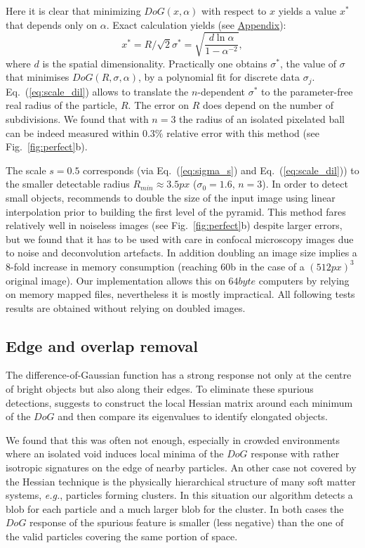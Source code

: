 \documentclass[8.5pt,twoside,twocolumn]{article}
\begin{document}
Here it is clear that minimizing $DoG(x, \alpha)$ with respect to $x$ yields a value $x^*$ that depends only on $\alpha$. Exact calculation yields (see \hyperref[sec:gaussian_vs_ball]{Appendix}):
\begin{equation}
	x^* = R/\sqrt{2}\sigma^* = \sqrt{\frac{d\ln \alpha}{1-\alpha^{-2}}}, 
	\label{eq:scale_dil}
\end{equation}
where $d$ is the spatial dimensionality. 
Practically one obtains $\sigma^*$, the value of $\sigma$ that minimises $DoG(R,\sigma, \alpha)$, by a polynomial fit for discrete data $\sigma_j$. Eq.~(\ref{eq:scale_dil}) allows to translate the $n$-dependent $\sigma^*$ to the parameter-free real radius of the particle, $R$. The error on $R$ does depend on the number of subdivisions. We found that with $n=3$ the radius of an isolated pixelated ball can be indeed measured within $0.3\%$ relative error with this method (see Fig.~\ref{fig:perfect}b).

The scale $s=0.5$ corresponds (via Eq.~(\ref{eq:sigma_s}) and Eq.~(\ref{eq:scale_dil})) to the smaller detectable radius $R_{min}\approx \unit{3.5}{px}$ ($\sigma_0=1.6$, $n=3$). In order to detect small objects, \citet{Lowe2004} recommends to double the size of the input image using linear interpolation prior to building the first level of the pyramid. This method fares relatively well in noiseless images (see Fig.~\ref{fig:perfect}b) despite larger errors, but we found that it has to be used with care in confocal microscopy images due to noise and deconvolution artefacts. In addition doubling an image size implies a 8-fold increase in memory consumption (reaching \unit{60}{\giga b} in the case of a $(\unit{512}{px})^3$ original image). Our implementation allows this on $\unit{64}{byte}$ computers by relying on memory mapped files, nevertheless it is mostly impractical. All following tests results are obtained without relying on doubled images.

\subsection{Edge and overlap removal}

The difference-of-Gaussian function has a strong response not only at the centre of bright objects but also along their edges. To eliminate these spurious detections, \citet{Lowe2004} suggests to construct the local Hessian matrix around each minimum of the $DoG$ and then compare its eigenvalues to identify elongated objects.

We found that this was often not enough, especially in crowded environments where an isolated void induces local minima of the $DoG$ response with rather isotropic signatures on the edge of nearby particles. An other case not covered by the Hessian technique is the physically hierarchical structure of many soft matter systems, \emph{e.g.}, particles forming clusters. In this situation our algorithm detects a blob for each particle and a much larger blob for the cluster. In both cases the $DoG$ response of the spurious feature is smaller (less negative) than the one of the valid particles covering the same portion of space. 
\end{document}
